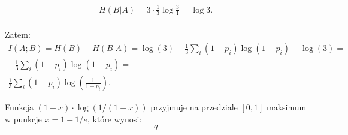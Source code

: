 \begin{multline*}
	H(B | A) = 3 \cdot \frac{1}{3} \log{\frac{3}{1}} = \log{3}. \\
\end{multline*}

Zatem:
\begin{multline*}
	I(A; B) = H(B) - H(B | A) = \log(3) - \frac{1}{3}\sum_{i} (1-p_{i})\log(1-p_{i}) - \log(3) = \\
	- \frac{1}{3}\sum_{i} (1-p_{i})\log(1-p_{i}) = \\
	\frac{1}{3}\sum_{i} (1-p_{i})\log\left(\frac{1}{1-p_{i}}\right).
\end{multline*}

Funkcja $(1-x)\cdot \log(1/(1-x))$ przyjmuje na przedziale $[0, 1]$ maksimum w punkcje $x = 1 - 1/e$, które wynosi:
$$
q
$$

